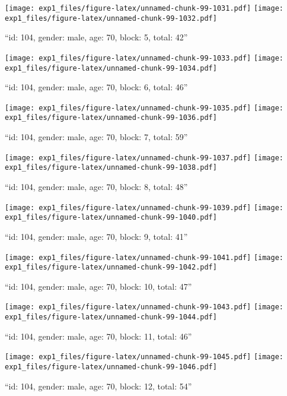 \documentclass[,]{article}
\begin{document}
\texttt{[image: exp1\_files/figure-latex/unnamed-chunk-99-1031.pdf]}
\texttt{[image: exp1\_files/figure-latex/unnamed-chunk-99-1032.pdf]}

\newpage
[1] 

``id: 104, gender: male, age: 70, block: 5, total: 42''

\texttt{[image: exp1\_files/figure-latex/unnamed-chunk-99-1033.pdf]}
\texttt{[image: exp1\_files/figure-latex/unnamed-chunk-99-1034.pdf]}

\newpage
[1] 

``id: 104, gender: male, age: 70, block: 6, total: 46''

\texttt{[image: exp1\_files/figure-latex/unnamed-chunk-99-1035.pdf]}
\texttt{[image: exp1\_files/figure-latex/unnamed-chunk-99-1036.pdf]}

\newpage
[1] 

``id: 104, gender: male, age: 70, block: 7, total: 59''

\texttt{[image: exp1\_files/figure-latex/unnamed-chunk-99-1037.pdf]}
\texttt{[image: exp1\_files/figure-latex/unnamed-chunk-99-1038.pdf]}

\newpage
[1] 

``id: 104, gender: male, age: 70, block: 8, total: 48''

\texttt{[image: exp1\_files/figure-latex/unnamed-chunk-99-1039.pdf]}
\texttt{[image: exp1\_files/figure-latex/unnamed-chunk-99-1040.pdf]}

\newpage
[1] 

``id: 104, gender: male, age: 70, block: 9, total: 41''

\texttt{[image: exp1\_files/figure-latex/unnamed-chunk-99-1041.pdf]}
\texttt{[image: exp1\_files/figure-latex/unnamed-chunk-99-1042.pdf]}

\newpage
[1] 

``id: 104, gender: male, age: 70, block: 10, total: 47''

\texttt{[image: exp1\_files/figure-latex/unnamed-chunk-99-1043.pdf]}
\texttt{[image: exp1\_files/figure-latex/unnamed-chunk-99-1044.pdf]}

\newpage
[1] 

``id: 104, gender: male, age: 70, block: 11, total: 46''

\texttt{[image: exp1\_files/figure-latex/unnamed-chunk-99-1045.pdf]}
\texttt{[image: exp1\_files/figure-latex/unnamed-chunk-99-1046.pdf]}

\newpage
[1] 

``id: 104, gender: male, age: 70, block: 12, total: 54''
\end{document}
